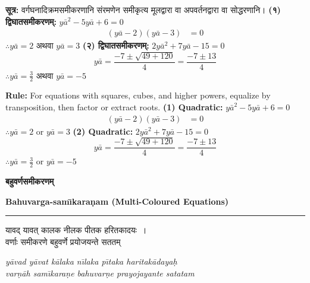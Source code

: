 \documentclass[11pt,a4paper]{article}
\newcommand{\dev}[1]{{\devanagarifont #1}}
\newcommand{\bicol}[2]{%
\noindent%
\begin{minipage}[t]{0.48\textwidth}
\begin{flushleft}
\small
#1
\end{flushleft}
\end{minipage}%
\hfill%
\begin{minipage}[t]{0.48\textwidth}
\begin{flushleft}
\small
#2
\end{flushleft}
\end{minipage}%
\vspace{0.4em}
}
\newcommand{\bicolverse}[2]{%
\par\noindent%
\begin{minipage}[t]{0.48\textwidth}
\centering
\color{versecolor}
\devanagarifont
\small
#1
\end{minipage}%
\hfill%
\begin{minipage}[t]{0.48\textwidth}
\centering
\color{versecolor}
\small
#2
\end{minipage}%
\par\vspace{0.4em}
}
\newcommand{\sectionbicol}[2]{%
\vspace{0.5em}
\noindent%
\begin{minipage}[t]{0.48\textwidth}
\begin{center}
\large\bfseries\color{sectioncolor}
\dev{#1}
\end{center}
\end{minipage}%
\hfill%
\begin{minipage}[t]{0.48\textwidth}
\begin{center}
\large\bfseries\color{sectioncolor}
#2
\end{center}
\end{minipage}%
\vspace{0.3em}
\noindent\rule{\textwidth}{0.4pt}
}
\begin{document}
\bicol{%
\textbf{सूत्र:} वर्गघनादिक्रमसमीकरणानि संरमणेन समीकृत्य मूलद्वारा वा अपवर्तनद्वारा वा सोद्धरणानि।
\vspace{0.3cm}
\textbf{(१) द्विघातसमीकरणम्:} $y\bar{a}^2 - 5y\bar{a} + 6 = 0$
\begin{align*}
(y\bar{a} - 2)(y\bar{a} - 3) &= 0
\end{align*}
$\therefore y\bar{a} = 2$ अथवा $y\bar{a} = 3$
\vspace{0.3cm}
\textbf{(२) द्विघातसमीकरणम्:} $2y\bar{a}^2 + 7y\bar{a} - 15 = 0$
\[y\bar{a} = \frac{-7 \pm \sqrt{49 + 120}}{4} = \frac{-7 \pm 13}{4}\]
$\therefore y\bar{a} = \frac{3}{2}$ अथवा $y\bar{a} = -5$
}{%
\textbf{Rule:} For equations with squares, cubes, and higher powers, equalize by transposition, then factor or extract roots.
\vspace{0.3cm}
\textbf{(1) Quadratic:} $y\bar{a}^2 - 5y\bar{a} + 6 = 0$
\begin{align*}
(y\bar{a} - 2)(y\bar{a} - 3) &= 0
\end{align*}
$\therefore y\bar{a} = 2$ or $y\bar{a} = 3$
\vspace{0.3cm}
\textbf{(2) Quadratic:} $2y\bar{a}^2 + 7y\bar{a} - 15 = 0$
\[y\bar{a} = \frac{-7 \pm \sqrt{49 + 120}}{4} = \frac{-7 \pm 13}{4}\]
$\therefore y\bar{a} = \frac{3}{2}$ or $y\bar{a} = -5$
}

\clearpage

\sectionbicol{बहुवर्णसमीकरणम्}{Bahuvarga-sam\={\i}kara\d{n}am (Multi-Coloured Equations)}

\vspace{0.3cm}

\bicolverse{%
यावद् यावत् कालक नीलक पीतक हरितकादयः~।\\
वर्णाः समीकरणे बहुवर्णे प्रयोजयन्ते सततम्~
}{%
\textit{y\={a}vad y\={a}vat k\={a}laka n\={\i}laka p\={\i}taka haritak\={a}daya\d{h}}\\
\textit{var\d{n}\={a}h sam\={\i}kara\d{n}e bahuvar\d{n}e prayojayante satatam}
}

\vspace{0.5cm}
\end{document}
